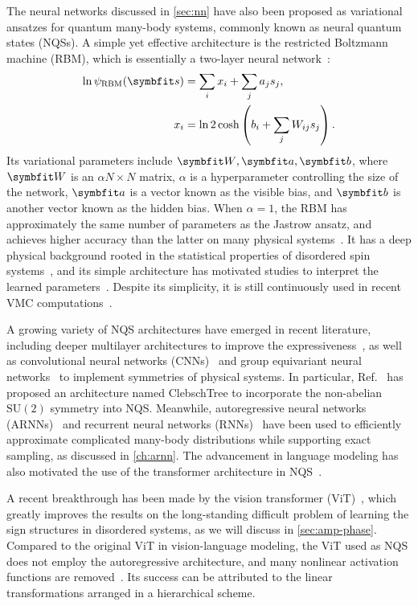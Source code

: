The neural networks discussed in \cref{sec:nn} have also been proposed as variational ansatzes for quantum many-body systems, commonly known as neural quantum states (NQSs). A simple yet effective architecture is the restricted Boltzmann machine (RBM), which is essentially a two-layer neural network~\cite{carleo2017solving}:
\begin{align}
\ln \psi_\text{RBM}(\vs) &= \sum_i x_i + \sum_j a_j s_j, \\
x_i &= \ln 2 \cosh\left( b_i + \sum_j W_{i j} s_j \right).
\end{align}
Its variational parameters include $\mW, \va, \vb$, where $\mW$ is an $\alpha N \times N$ matrix, $\alpha$ is a hyperparameter controlling the size of the network, $\va$ is a vector known as the visible bias, and $\vb$ is another vector known as the hidden bias. When $\alpha = 1$, the RBM has approximately the same number of parameters as the Jastrow ansatz, and achieves higher accuracy than the latter on many physical systems~\cite{wu2023variational}. It has a deep physical background rooted in the statistical properties of disordered spin systems~\cite{sherrington1975solvable, hopfield1982neural}, and its simple architecture has motivated studies to interpret the learned parameters~\cite{abdollahi2016explainable, fernandez2023disentangling}. Despite its simplicity, it is still continuously used in recent VMC computations~\cite{nomura2017restricted, nomura2021dirac}.

A growing variety of NQS architectures have emerged in recent literature, including deeper multilayer architectures to improve the expressiveness~\cite{carleo2018constructing, sharir2022neural}, as well as convolutional neural networks (CNNs)~\cite{choo2019two} and group equivariant neural networks~\cite{luo2021gauge, roth2021group} to implement symmetries of physical systems. In particular, Ref.~\cite{vieijra2021many} has proposed an architecture named ClebschTree to incorporate the non-abelian $\mathrm{SU}(2)$ symmetry into NQS. Meanwhile, autoregressive neural networks (ARNNs)~\cite{sharir2020deep} and recurrent neural networks (RNNs)~\cite{hibat2020recurrent, roth2020iterative} have been used to efficiently approximate complicated many-body distributions while supporting exact sampling, as discussed in \cref{ch:arnn}. The advancement in language modeling has also motivated the use of the transformer architecture in NQS~\cite{luo2021gauge, zhang2023transformer}.

A recent breakthrough has been made by the vision transformer (ViT)~\cite{viteritti2023transformer, viteritti2023transformer2, cao2024vision}, which greatly improves the results on the long-standing difficult problem of learning the sign structures in disordered systems, as we will discuss in \cref{sec:amp-phase}. Compared to the original ViT in vision-language modeling, the ViT used as NQS does not employ the autoregressive architecture, and many nonlinear activation functions are removed~\cite{rende2024queries}. Its success can be attributed to the linear transformations arranged in a hierarchical scheme.

